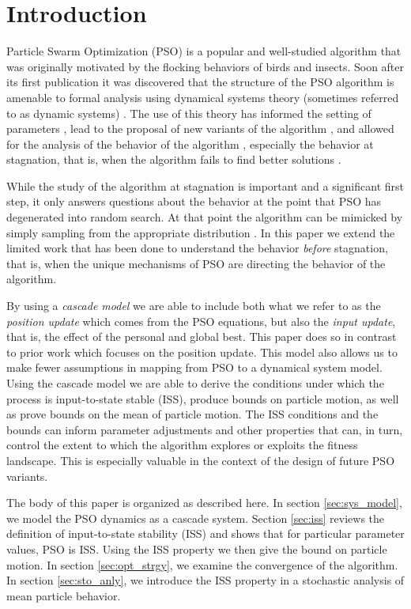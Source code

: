 \section{Introduction}
\label{sec:intro}
Particle Swarm Optimization (PSO) is a popular and well-studied algorithm that was originally motivated by the flocking behaviors of birds and insects.
Soon after its first publication it was discovered that the structure of the PSO algorithm is amenable to formal analysis using dynamical systems theory (sometimes referred to as dynamic systems) \cite{985692}.
The use of this theory has informed the setting of parameters \cite{Trelea2003317,Jiang20078}, lead to the proposal of new variants of the algorithm \cite{985692}, and allowed for the analysis of the behavior of the algorithm \cite{Schmitt:2013:PSO:2463372.2463563}, especially the behavior at stagnation, that is, when the algorithm fails to find better solutions \cite{985692}.

While the study of the algorithm at stagnation is important and a significant first step, it only answers questions about the behavior at the point that PSO has degenerated into random search.
At that point the algorithm can be mimicked by simply sampling from the appropriate distribution \cite{5175367}.
In this paper we extend the limited work that has been done to understand
the behavior \emph{before} stagnation, that is, when the unique mechanisms of PSO are directing the behavior of the algorithm.

By using a \emph{cascade model} we are able to include both what we refer to as the \emph{position update} which comes from the PSO equations, but also the \emph{input update}, that is, the effect of the personal and global best.
This paper does so in contrast to prior work which focuses on the position update.
This model also allows us to make fewer assumptions in mapping from PSO to a dynamical system model.
Using the cascade model we are able to derive the conditions under which the process is input-to-state stable (ISS)\cite{Jiang2001857}, produce bounds on particle motion, as well as prove bounds on the mean of particle motion.
The ISS conditions and the bounds can inform parameter adjustments and other properties that can, in turn, control the extent to which the algorithm explores or exploits the fitness landscape.
This is especially valuable in the context of the design of future PSO variants. 

The body of this paper is organized as described here.
In section \ref{sec:sys_model}, we model the PSO dynamics as a cascade system.
Section \ref{sec:iss} reviews the definition of input-to-state stability (ISS) and shows that for particular parameter values, PSO is ISS. Using the ISS property we then give the bound on particle motion.
In section \ref{sec:opt_strgy}, we examine the convergence of the algorithm.
In section \ref{sec:sto_anly}, we introduce the ISS property in a stochastic analysis of mean
particle behavior.

